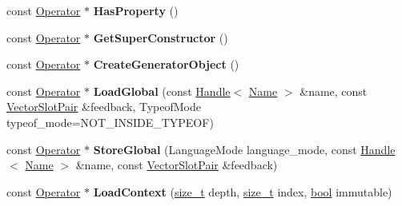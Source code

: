 \begin{DoxyCompactItemize}
const \mbox{\hyperlink{classv8_1_1internal_1_1compiler_1_1Operator}{Operator}} $\ast$ {\bfseries Has\+Property} ()
\item 
\mbox{\label{classv8_1_1internal_1_1compiler_1_1JSOperatorBuilder_adefdbb424dee3587fb0fc0d9f6ee533a}} 
const \mbox{\hyperlink{classv8_1_1internal_1_1compiler_1_1Operator}{Operator}} $\ast$ {\bfseries Get\+Super\+Constructor} ()
\item 
\mbox{\label{classv8_1_1internal_1_1compiler_1_1JSOperatorBuilder_a70032d6b4de6b08b314aaad320e1b6a5}} 
const \mbox{\hyperlink{classv8_1_1internal_1_1compiler_1_1Operator}{Operator}} $\ast$ {\bfseries Create\+Generator\+Object} ()
\item 
\mbox{\label{classv8_1_1internal_1_1compiler_1_1JSOperatorBuilder_a499ecf480915559b7f857e6598953bb6}} 
const \mbox{\hyperlink{classv8_1_1internal_1_1compiler_1_1Operator}{Operator}} $\ast$ {\bfseries Load\+Global} (const \mbox{\hyperlink{classv8_1_1internal_1_1Handle}{Handle}}$<$ \mbox{\hyperlink{classv8_1_1internal_1_1Name}{Name}} $>$ \&name, const \mbox{\hyperlink{classv8_1_1internal_1_1VectorSlotPair}{Vector\+Slot\+Pair}} \&feedback, Typeof\+Mode typeof\+\_\+mode=N\+O\+T\+\_\+\+I\+N\+S\+I\+D\+E\+\_\+\+T\+Y\+P\+E\+OF)
\item 
\mbox{\label{classv8_1_1internal_1_1compiler_1_1JSOperatorBuilder_a66c56509a6a9834cdc913610477821c1}} 
const \mbox{\hyperlink{classv8_1_1internal_1_1compiler_1_1Operator}{Operator}} $\ast$ {\bfseries Store\+Global} (Language\+Mode language\+\_\+mode, const \mbox{\hyperlink{classv8_1_1internal_1_1Handle}{Handle}}$<$ \mbox{\hyperlink{classv8_1_1internal_1_1Name}{Name}} $>$ \&name, const \mbox{\hyperlink{classv8_1_1internal_1_1VectorSlotPair}{Vector\+Slot\+Pair}} \&feedback)
\item 
\mbox{\label{classv8_1_1internal_1_1compiler_1_1JSOperatorBuilder_aead4c26af455cd91df329c04097345ae}} 
const \mbox{\hyperlink{classv8_1_1internal_1_1compiler_1_1Operator}{Operator}} $\ast$ {\bfseries Load\+Context} (\mbox{\hyperlink{classsize__t}{size\+\_\+t}} depth, \mbox{\hyperlink{classsize__t}{size\+\_\+t}} index, \mbox{\hyperlink{classbool}{bool}} immutable)

\end{DoxyCompactItemize}
